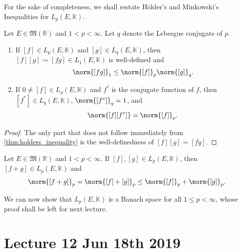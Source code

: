 \documentclass[notoc,notitlepage]{tufte-book}
\begin{document}
For the sake of completeness, we shall restate H\"{o}lder's and Minkowski's
Inequalities for $L_p(E, \mathbb{K})$.

\begin{thm}\label{thm:holders_inequality_lp_spaces}
  Let $E \in \mathfrak{M}(\mathbb{R})$ and $1 < p < \infty$. Let $q$ denote the
  Lebesgue conjugate of $p$.
  \begin{enumerate}
    \item If $[f] \in L_p(E, \mathbb{K})$ and $[g] \in L_q(E, \mathbb{K})$, then
      $[f][g] \coloneqq [fg] \in L_1(E, \mathbb{K})$ is well-defined and
      \begin{equation*}
        \norm{[fg]}_1 \leq \norm{[f]}_p \norm{[g]}_q.
      \end{equation*}
    \item If $0 \neq [f] \in L_p(E, \mathbb{K})$ and $f^*$ is the conjugate
      function of $f$, then $[f^*] \in L_q(E, \mathbb{K})$, $\norm{[f^*]}_q =
      1$, and
      \begin{equation*}
        \norm{[f][f^*]} = \norm{[f]}_p.
      \end{equation*}
  \end{enumerate}
\end{thm}

\begin{proof}
  The only part that does not follow immediately from
  \cref{thm:holders_inequality} is the well-definedness of $[f][g] = [fg]$.
\end{proof}

\begin{thm}\label{thm:minkowski_s_inequality_lp_spaces}
  Let $E \in \mathfrak{M}(\mathbb{R})$ and $1 < p < \infty$. If $[f], [g] \in
  L_p(E, \mathbb{K})$, then $[f + g] \in L_p(E, \mathbb{K})$ and
  \begin{equation*}
    \norm{[f + g]}_p = \norm{[f] + [g]}_p \leq \norm{[f]}_p + \norm{[g]}_p.
  \end{equation*}
\end{thm}

We can now show that $L_p(E, \mathbb{K})$ is a Banach space for all $1 \leq p <
\infty$, whose proof shall be left for next lecture.



\chapter{Lecture 12 Jun 18th 2019}%
\label{chp:lecture_12_jun_18th_2019}
\end{document}
